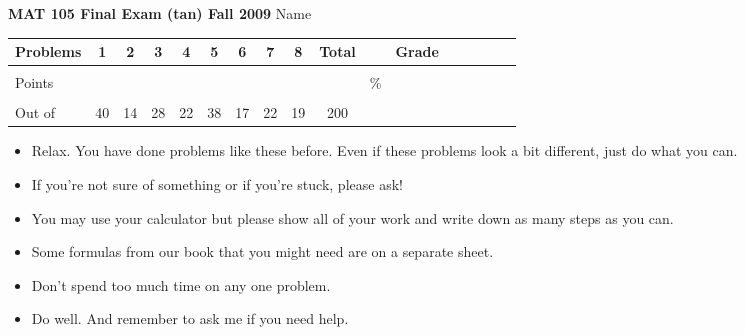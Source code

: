 \documentclass[12pt]{article}
\begin{document}
{\bf MAT 105 Final Exam (tan) Fall 2009} \hspace{.4in} {\large Name} \hrulefill

\hspace{.2in}

\begin{center}

\begin{tabular}
{|l|c|c|c|c|c|c|c|c|c|c|c|c|c|c|c|c|} \hline

 Problems & \hspace{5 pt} 1 \hspace{5 pt}  & \hspace{5 pt} 2 \hspace{5 pt} & \hspace{5 pt} 3 \hspace{5 pt} & \hspace{5 pt} 4 \hspace{5 pt}& \hspace{5 pt} 5 \hspace{5 pt} & \hspace{5 pt} 6 \hspace{5 pt} & \hspace{5 pt} 7 \hspace{5 pt}   & \hspace{5 pt} 8 \hspace{5 pt} &  \hspace{5 pt} Total  \hspace{5 pt} & &  \hspace{5 pt} Grade \hspace{5 pt}  \\ \hline
&&&&&&&&&&&\\  
Points &&&&&&&&&&   \hspace{.6in}\% &  \\ 
&&&&&&&&&&& \\  \hline
Out of & 40  & 14 & 28 & 22 & 38 & 17 & 22 & 19 &200 & & \\ \hline

\end {tabular}
 
\end{center}

\hspace{.2in}

\begin{itemize}
\item Relax.  You have done problems like these before. Even if these problems look a bit different, just do what you can. 
\item  If you're not sure of something or if you're stuck, please ask! 
\item You may use your calculator but please show all of your work and write down as many steps as you can.  
\item Some formulas from our book that you might need are on a separate sheet.
\item Don't spend too much time on any one problem.
\item  Do well.  And remember to ask me if you need help.
\end{itemize}
\end{document}

